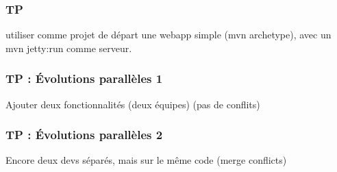 \begin{frame}\frametitle{TP}
  utiliser comme projet de départ une webapp simple (mvn archetype), avec un mvn
jetty:run comme serveur.
\end{frame}
\begin{frame}\frametitle{TP : Évolutions parallèles 1}
  Ajouter deux fonctionnalités (deux équipes) (pas de conflits)
\end{frame}
\begin{frame}\frametitle{TP : Évolutions parallèles 2}
  Encore deux devs séparés, mais sur le même code (merge conflicts)
\end{frame}
